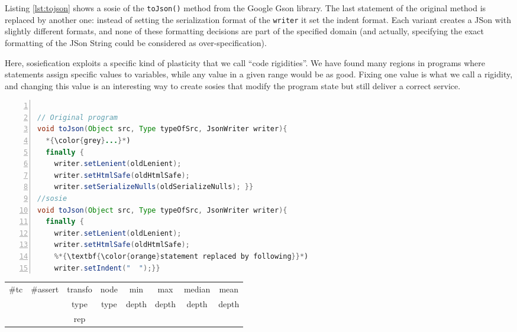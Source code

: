 Listing \ref{lst:tojson} shows a sosie of  the \texttt{toJson()} method from the Google Gson library. 
The last statement of the original method is replaced by another one: instead of setting the serialization format of the \texttt{writer} it set the indent format. 
Each variant creates a JSon with slightly different formats,  and none of these formatting decisions are part of the specified domain (and actually, specifying the exact formatting of the JSon String could be considered as over-specification). 

Here, sosiefication exploits a specific kind of plasticity that we call ``code rigidities''. We have found many regions in programs where statements assign specific values to variables, while any value in a given range would be as good. Fixing one value is what we call a rigidity, and changing this value is an interesting way to create sosies that modify the program state but still deliver a correct service.

\begin{minipage}{\columnwidth}
\begin{lstlisting}[caption={\texttt{toJson} in GSON and a sosie},label={lst:tojson},language=java,numbers=left]

// Original program
void toJson(Object src, Type typeOfSrc, JsonWriter writer){
  *{\color{grey}...}*)
  finally {
    writer.setLenient(oldLenient);
    writer.setHtmlSafe(oldHtmlSafe);
    writer.setSerializeNulls(oldSerializeNulls); }}
//sosie
void toJson(Object src, Type typeOfSrc, JsonWriter writer){
  finally {
    writer.setLenient(oldLenient);
    writer.setHtmlSafe(oldHtmlSafe);
    %*{\textbf{\color{orange}statement replaced by following}}*) 
    writer.setIndent("  ");}} 
\end{lstlisting}
\tabcolsep=0.11cm
\begin{tabular}{>{\small}c>{\small}c>{\small}c>{\small}c>{\small}c>{\small}c>{\small}c>{\small}c}
\hline
\rowcolor{lightgray} \#tc & \#assert & transfo & node & min & max & median & mean   \\
\rowcolor{lightgray}  & & type & type & depth  & depth & depth & depth  \\ 
\hline
 &  & rep &  &  &  &  & \\
\hline
\end{tabular}
\end{minipage}
